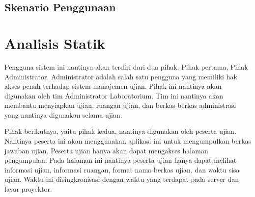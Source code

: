 


\subsection{Skenario Penggunaan}

\section{Analisis Statik}


Pengguna sistem ini nantinya akan terdiri dari dua pihak. Pihak pertama, Pihak
Administrator. Administrator adalah salah satu pengguna yang memiliki hak akses
penuh terhadap sistem manajemen ujian. Pihak ini nantinya akan digunakan oleh
tim Administrator Laboratorium. Tim ini nantinya akan membantu menyiapkan ujian,
ruangan ujian, dan berkas-berkas administrasi yang nantinya digunakan selama
ujian.

Pihak berikutnya, yaitu pihak kedua, nantinya digunakan oleh peserta ujian.
Nantinya peserta ini akan menggunakan aplikasi ini untuk mengumpulkan berkas
jawaban ujian. Peserta ujian hanya akan dapat mengakses halaman pengumpulan.
Pada halaman ini nantinya peserta ujian hanya dapat melihat informasi ujian,
informasi ruangan, format nama berkas ujian, dan waktu sisa ujian. Waktu ini
disingkronisasi dengan waktu yang terdapat pada server dan layar proyektor.